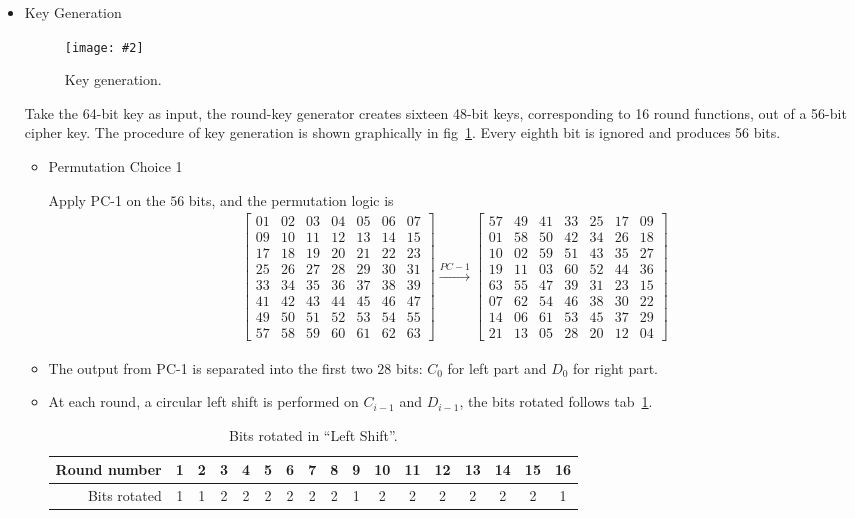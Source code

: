 \documentclass[11pt,a4paper]{article}
\newcommand{\image}[3]{
	\begin{figure}[!ht]
		\centering
	    \texttt{[image: \#2]}
		\caption{#3}
		\label{fig:#2}
	\end{figure}
}
\begin{document}
\begin{enumerate}
\begin{itemize}
		\item Key Generation
		\image{0.75}{KG}{Key generation.}
		\par Take the 64-bit key as input, the round-key generator creates sixteen 48-bit keys, corresponding to 16 round functions, out of a 56-bit cipher key. The procedure of key generation is shown graphically in fig~\ref{fig:KG}. Every eighth bit is ignored and produces 56 bits.
		\begin{itemize}
			\item Permutation Choice 1
			\par Apply PC-1 on the $56$ bits, and the permutation logic is
			\begin{align*}
				\begin{bmatrix}
					01 & 02 & 03 & 04 & 05 & 06 & 07 \\
					09 & 10 & 11 & 12 & 13 & 14 & 15 \\
					17 & 18 & 19 & 20 & 21 & 22 & 23 \\
					25 & 26 & 27 & 28 & 29 & 30 & 31 \\
					33 & 34 & 35 & 36 & 37 & 38 & 39 \\
					41 & 42 & 43 & 44 & 45 & 46 & 47 \\
					49 & 50 & 51 & 52 & 53 & 54 & 55 \\
					57 & 58 & 59 & 60 & 61 & 62 & 63 
				\end{bmatrix}
				\xrightarrow{PC-1}
				\begin{bmatrix}
					57 & 49 & 41 & 33 & 25 & 17 & 09 \\
					01 & 58 & 50 & 42 & 34 & 26 & 18 \\
					10 & 02 & 59 & 51 & 43 & 35 & 27 \\
					19 & 11 & 03 & 60 & 52 & 44 & 36 \\
					63 & 55 & 47 & 39 & 31 & 23 & 15 \\
					07 & 62 & 54 & 46 & 38 & 30 & 22 \\
					14 & 06 & 61 & 53 & 45 & 37 & 29 \\
					21 & 13 & 05 & 28 & 20 & 12 & 04
				\end{bmatrix}
			\end{align*}
			
			\item The output from PC-1 is separated into the first two $28$ bits: $C_{0}$ for left part and $D_{0}$ for right part.
			\item At each round, a circular left shift is performed on $C_{i-1}$ and $D_{i-1}$, the bits rotated follows tab~\ref{tab:LS}.
			\begin{table}[!ht]
				\centering
				\caption{Bits rotated in ``Left Shift''.}
				\label{tab:LS}
				\begin{tabular}{r|cccccccccccccccc}
					Round number & 1 & 2 & 3 & 4 & 5 & 6 & 7 & 8 & 9 & 10 & 11 & 12 & 13 & 14 & 15 & 16 \\\hline
					Bits rotated & 1 & 1 & 2 & 2 & 2 & 2 & 2 & 2 & 1 & 2 & 2 & 2 & 2 & 2 & 2 & 1
				\end{tabular}
			\end{table}
			

\end{itemize}
\end{itemize}
\end{enumerate}
\end{document}
